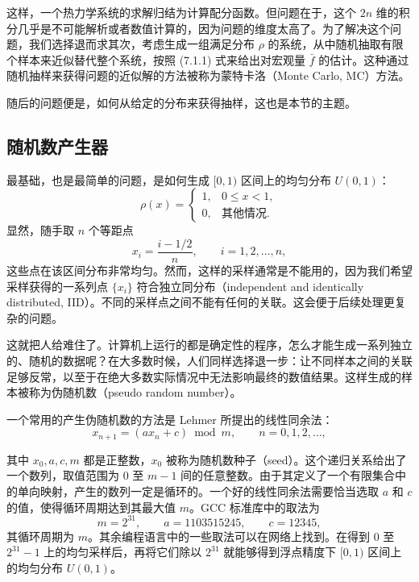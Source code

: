 这样，一个热力学系统的求解归结为计算配分函数。但问题在于，这个 $2n$ 维的积分几乎是不可能解析或者数值计算的，因为问题的维度太高了。为了解决这个问题，我们选择退而求其次，考虑生成一组满足分布 $\rho$ 的系统，从中随机抽取有限个样本来近似替代整个系统，按照 (7.1.1) 式来给出对宏观量 $\bar f$ 的估计。这种通过随机抽样来获得问题的近似解的方法被称为蒙特卡洛（Monte Carlo, MC）方法。

随后的问题便是，如何从给定的分布来获得抽样，这也是本节的主题。

\subsection{随机数产生器}

最基础，也是最简单的问题，是如何生成 $[0,1)$ 区间上的均匀分布 $U(0,1)$：
\begin{equation}
 \rho(x)=
 \begin{cases}
 1,&0\le x<1,\\
 0,&\text{其他情况}.
 \end{cases}
\tag{7.1.11}
\end{equation}
显然，随手取 $n$ 个等距点
\begin{equation}
 x_i=\frac{i-1/2}{n},\qquad i=1,2,\ldots,n,
\tag{7.1.12}
\end{equation}
这些点在该区间分布非常均匀。然而，这样的采样通常是不能用的，因为我们希望采样获得的一系列点 $\{x_i\}$ 符合独立同分布（independent and identically distributed, IID）。不同的采样点之间不能有任何的关联。这会便于后续处理更复杂的问题。

这就把人给难住了。计算机上运行的都是确定性的程序，怎么才能生成一系列独立的、随机的数据呢？在大多数时候，人们同样选择退一步：让不同样本之间的关联足够反常，以至于在绝大多数实际情况中无法影响最终的数值结果。这样生成的样本被称为伪随机数（pseudo random number）。

一个常用的产生伪随机数的方法是 Lehmer 所提出的线性同余法：
\begin{equation}
 x_{n+1}=(ax_n+c)\bmod m,\qquad n=0,1,2,\ldots,
\tag{7.1.13}
\end{equation}

其中 $x_0,a,c,m$ 都是正整数，$x_0$ 被称为随机数种子（seed）。这个递归关系给出了一个数列，取值范围为 $0$ 至 $m-1$ 间的任意整数。由于其定义了一个有限集合中的单向映射，产生的数列一定是循环的。一个好的线性同余法需要恰当选取 $a$ 和 $c$ 的值，使得循环周期达到其最大值 $m$。GCC 标准库中的取法为
\begin{equation}
 m=2^{31},\qquad a=1103515245,\qquad c=12345,
\tag{7.1.14}
\end{equation}
其循环周期为 $m$。其余编程语言中的一些取法可以在网络上找到。在得到 $0$ 至 $2^{31}-1$ 上的均匀采样后，再将它们除以 $2^{31}$ 就能够得到浮点精度下 $[0,1)$ 区间上的均匀分布 $U(0,1)$。

